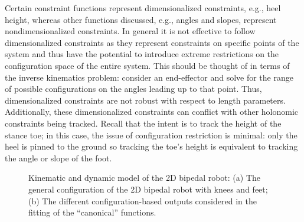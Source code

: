\begin{remark} \label{rmk:dimconst}
  Certain constraint functions represent dimensionalized constraints, e.g., heel
  height, whereas other functions discussed, e.g., angles and slopes, represent
  nondimensionalized constraints.
  In general it is not effective to follow dimensionalized constraints as they
  represent constraints on specific points of the system and thus have the
  potential to introduce extreme restrictions on the configuration space of the
  entire system.
  This should be thought of in terms of the inverse kinematics problem:
  consider an end-effector and solve for the range of possible configurations on
  the angles leading up to that point.
  Thus, dimensionalized constraints are not robust with respect to length
  parameters.
  Additionally, these dimensionalized constraints can conflict with other
  holonomic constraints being tracked.
  Recall that the intent is to track the height of the stance toe;
  in this case, the issue of configuration restriction is minimal:
  only the heel is pinned to the ground so tracking the toe's height is
  equivalent to tracking the angle or slope of the foot.
\end{remark}

\begin{figure}[t!]
  \centering
  \hspace{.2cm}
  \caption[Kinematic and dynamic model of the 2D bipedal robot.]{Kinematic and
    dynamic model of the 2D bipedal robot:
    (a) The general configuration of the 2D bipedal robot with knees and feet;
    (b) The different configuration-based outputs considered in the fitting of
    the ``canonical'' functions.}
  \label{fig:robotconstraints}
\end{figure}

